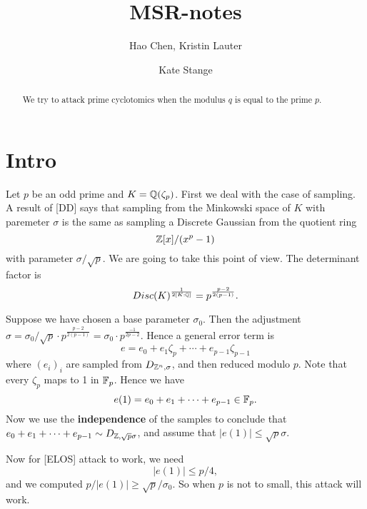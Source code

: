 \documentclass{amsart}
\title{MSR-notes}
\author{Hao Chen, Kristin Lauter \and Kate Stange}
\begin{document}
\maketitle

\begin{abstract}
We try to attack prime cyclotomics when the modulus $q$ is
equal to the prime $p$.
\end{abstract}

\section{Intro} Let $p$ be an odd prime and $K = \mathbb{Q}(\zeta_p)$. First we deal with the case of sampling. A result of [DD] says that sampling from the Minkowski space of $K$ with paremeter $\sigma$ is the same as sampling a Discrete Gaussian from the quotient ring
\[
    \mathbb{Z}[x]/(x^p-1)
\]
with parameter $\sigma/\sqrt{p}$. We are going to take this point of view. The determinant factor is
$$Disc(K)^{\frac{1}{2[K:\mathbb{Q}]}} = p^{\frac{p-2}{2(p-1)}}.$$

Suppose we have chosen a base parameter $\sigma_0$. Then the adjustment $\sigma = \sigma_0/\sqrt{p} \cdot p^{\frac{p-2}{2(p-1)}} = \sigma_0 \cdot p^{\frac{-1}{2p-2}}$. Hence a general error term is
\[
    e = e_0 + e_1 \zeta_p + \cdots + e_{p-1} \zeta_{p-1}
\]
where $(e_i)_i$ are sampled from $D_{\mathbb{Z}^n, \sigma}$, and then reduced modulo $p$. Note that every $\zeta_p$ maps to 1 in $\mathbb{F}_p$. Hence we have
\[
    e(1) = e_0 + e_1 + \cdots +e_{p-1} \in \mathbb{F}_p.
\]
Now we use the {\bf independence} of the samples to conclude that $e_0 + e_1 + \cdots +e_{p-1} \sim D_{\mathbb{Z},\sqrt{p}\sigma}$, and assume that $|e(1)| \leq \sqrt{p}\sigma$.

Now for [ELOS] attack to work, we need
\[
    |e(1)| \leq p/4,
\]
and we computed $p/|e(1)| \geq \sqrt{p}/\sigma_0$. So when $p$ is not to small, this attack will work.
\end{document}
